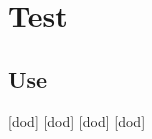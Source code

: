\documentclass{moderntech}
\begin{document}
\chapter{Test}
\section{Use}
[\gls{dod}] [\ac{dod}] [\gls{dod}] [\ac{dod}]\par
\printnoidxglossaries
\end{document}
